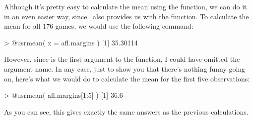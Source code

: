 Although it's pretty easy to calculate the mean using the  function, we can do it in an even easier way, since \R\ also provides us with the  function. To calculate the mean for all 176 games, we would use the following command:
\begin{rblock1}
> @usr{mean( x = afl.margins )}
[1] 35.30114
\end{rblock1}
However, since  is the first argument to the function, I could have omitted the argument name. In any case, just to show you that there's nothing funny going on, here's what we would do to calculate the mean for the first five observations:
\begin{rblock1}
> @usr{mean( afl.margins[1:5] )}
[1] 36.6
\end{rblock1}
As you can see, this gives exactly the same answers as the previous calculations. 




